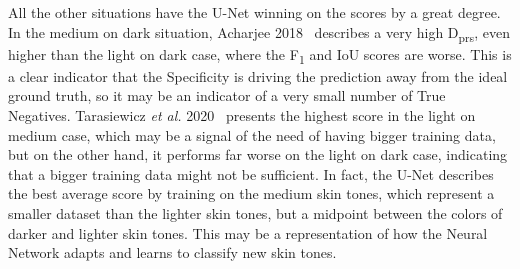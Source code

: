 All the other situations have the U-Net winning on the scores by a great degree.
In the medium on dark situation, Acharjee 2018~\cite{acharjee2018skin} describes a very high D\textsubscript{prs}, even higher than the light on dark case, where the F\textsubscript{1} and IoU scores are worse.
This is a clear indicator that the Specificity is driving the prediction away from the ideal ground truth, so it may be an indicator of a very small number of True Negatives.
Tarasiewicz \textit{et al.} 2020~\cite{tarasiewicz2020skinny} presents the highest score in the light on medium case, which may be a signal of the need of having bigger training data, but on the other hand, it performs far worse on the light on dark case, indicating that a bigger training data might not be sufficient.
In fact, the U-Net describes the best average score by training on the medium skin tones, which represent a smaller dataset than the lighter skin tones, but a midpoint between the colors of darker and lighter skin tones.
This may be a representation of how the Neural Network adapts and learns to classify new skin tones.

